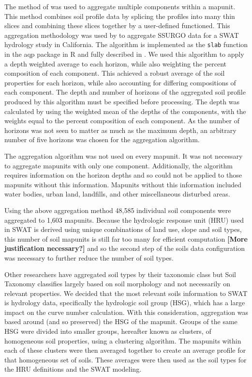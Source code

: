 The method of \citet{beaudette_aqp_2013} was used to aggregate multiple components within a mapunit. This method combines soil profile data by splicing the profiles into many thin slices and combining these slices together by a user-defined functioned. This aggregation methodology was used by \citet{gatzke_soilaggregation_2011} to aggregate SSURGO data for a SWAT hydrology study in California. The algorithm is implemented as the \texttt{slab} function in the aqp package in R  and fully described in \citet{beaudette_aqp_2013}. We used this algorithm to apply a depth weighted average to each horizon, while also weighting the percent composition of each component. This achieved a robust average of the soil properties for each horizon, while also accounting for differing compositions of each component. The depth and number of horizons of the aggregated soil profile produced by this algorithm must be specified before processing. The depth was calculated by using the weighted mean of the depths of the components, with the weights equal to the percent composition of each component. As the number of horizons was not seen to matter as much as the maximum depth, an arbitrary number of five horizons was chosen for the aggregation algorithm. 

The aggregation algorithm was not used on every mapunit. It was not necessary to aggregate mapunits with only one component. Additionally, the algorithm requires information on the horizon depths and so could not be applied to those mapunits without this information. Mapunits without this information included water bodies, urban land, landfills, and other miscellaneous disturbed areas. 

Using the above aggregation method 48,585 individual soil components were aggregated to 1,603 mapunits. Because the hydrologic	response unit (HRU) used in SWAT	is derived using unique combinations of land use, slope and soil types, this number of soil mapunits is still far too many for efficient computation \textbf{[More justification necessary?]} and so the second step of the soils data configuration was necessary to further reduce the number of soil types.

Other researchers have aggregated soil types by their taxonomic class \citep{gatzke_soilaggregation_2011} but Soil Taxonomy classifies largely based on soil morphology and not necessarily on relevant properties. We decided that the most relevant soils information to SWAT is hydrology data, specifically the hydrologic soil group (HSG), which has a large impact on the curve number calculation. With this consideration, aggregation was based around (and so preserved) the HSG of the mapunit. Groups of the same HSG were divided into smaller groups, hereafter known as clusters, of homogeneous soil properties, using a clustering algorithm. The mapunits within each of these clusters were then averaged together to create an average profile for that homogeneous set of soils. These averages were then used as the soil types for the HRU definitions and the SWAT modeling.

